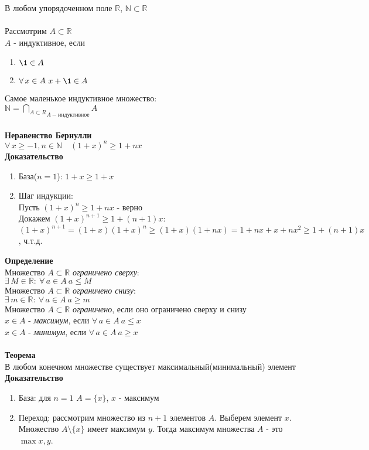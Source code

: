 \documentclass[12pt]{article}
\begin{document}
В любом упорядоченном поле $\mathbb{R}$, $\mathbb{N} \subset \mathbb{R}$\\\\
Рассмотрим $A\subset\mathbb{R}$\\
$A$ - индуктивное, если\begin{enumerate}
    \item $\1 \in A$
    \item $\forall\,x\in A\ x+\1 \in A$
\end{enumerate}
Самое маленькое индуктивное множество:\\
$\mathbb{N} = \underset{A-\text{индуктивное}}{\bigcap_{A\subset R}} A$\\\\
\textbf{Неравенство Бернулли}\\
$\forall\,x\geq -1, n\in \mathbb{N}\quad(1+x)^n \geq 1+nx$\\
\textbf{Доказательство}
\begin{enumerate}
    \item База($n=1$): $1+x \geq 1+x$
    \item Шаг индукции:\\
    Пусть $(1+x)^n \geq 1+nx$ - верно\\
    Докажем $(1+x)^{n+1} \geq 1+(n+1)x$:\\
    $(1+x)^{n+1}=(1+x)(1+x)^n \geq (1+x)(1+nx) = 1 + nx + x + nx^2 \geq 1+(n+1)x$, ч.т.д.
\end{enumerate}
\textbf{Определение}\\
Множество $A \subset \mathbb{R}$ \textit{ограничено сверху}:\\
$\exists\,M\in\mathbb{R}:\ \forall\,a\in A\ a\leq M$\\
Множество $A \subset \mathbb{R}$ \textit{ограничено снизу}:\\
$\exists\,m\in\mathbb{R}:\ \forall\,a\in A\ a\geq m$\\
Множество $A \subset \mathbb{R}$ \textit{ограничено}, если оно ограничено сверху и снизу\\
$x \in A$ - \textit{максимум}, если $\forall\,a\in A\ a\leq x$\\
$x \in A$ - \textit{минимум}, если $\forall\,a\in A\ a\geq x$\\\\
\textbf{Теорема}\\
В любом конечном множестве существует максимальный(минимальный) элемент\\
\textbf{Доказательство}
\begin{enumerate}
    \item База: для $n=1$ $A=\{x\}$, $x$ - максимум
    \item Переход: рассмотрим множество из $n+1$ элементов $A$. Выберем элемент $x$. Множество $A\setminus\{x\}$ имеет максимум $y$. Тогда максимум множества $A$ - это $\max x,y$.
\end{enumerate}
\end{document}
